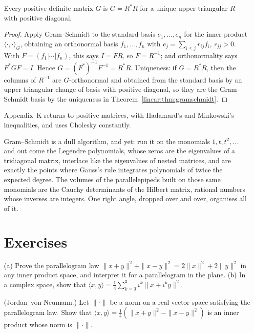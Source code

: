 \begin{corollary}\label{linear:cor:cholesky}
Every positive definite matrix $G$ is $G=R^*R$ for a unique upper triangular $R$ with positive diagonal.
\end{corollary}
\begin{proof}
Apply Gram--Schmidt to the standard basis $e_1,\dots,e_n$ for the inner product $\langle\cdot,\cdot\rangle_G$, obtaining
an orthonormal basis $f_1,\dots,f_n$ with $e_j=\sum_{i\le j}r_{ij}f_i$, $r_{jj}>0$. With $F=(f_1|\cdots|f_n)$, this says
$I=FR$, so $F=R^{-1}$; and orthonormality says $F^*GF=I$. Hence $G=(F^*)^{-1}F^{-1}=R^*R$. Uniqueness: if $G=R^*R$, then
the columns of $R^{-1}$ are $G$-orthonormal and obtained from the standard basis by an upper triangular change of
basis with positive diagonal, so they are the Gram--Schmidt basis by the uniqueness in Theorem~\ref{linear:thm:gramschmidt}.
\end{proof}

Appendix~K returns to positive matrices, with Hadamard's and Minkowski's inequalities, and uses Cholesky constantly.

\begin{beauty}
Gram--Schmidt is a dull algorithm, and yet: run it on the monomials $1,t,t^2,\dots$ and out come the Legendre
polynomials, whose zeros are the eigenvalues of a tridiagonal matrix, interlace like the eigenvalues of nested
matrices, and are exactly the points where Gauss's rule integrates polynomials of twice the expected degree. The volumes
of the parallelepipeds built on those same monomials are the Cauchy determinants of the Hilbert matrix, rational numbers
whose inverses are integers. One right angle, dropped over and over, organises all of it.
\end{beauty}

\section{Exercises}

\begin{exercise}[$\star$]\label{linear:ex:polar}
(a) Prove the parallelogram law $\|x+y\|^2+\|x-y\|^2=2\|x\|^2+2\|y\|^2$ in any inner product space, and interpret it for
a parallelogram in the plane. (b) In a complex space, show that $\langle x,y\rangle=\frac14\sum_{k=0}^3i^k\|x+i^ky\|^2$.
\end{exercise}

\begin{exercise}[$\star\star\star$]\label{linear:ex:jvn}
(Jordan--von Neumann.) Let $\|\cdot\|$ be a norm on a real vector space satisfying the parallelogram law. Show that
$\langle x,y\rangle=\frac14(\|x+y\|^2-\|x-y\|^2)$ is an inner product whose norm is $\|\cdot\|$.
\end{exercise}

